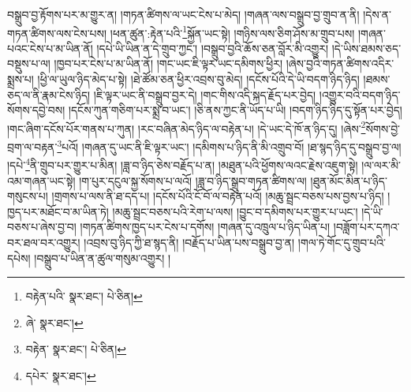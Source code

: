 བསྒྲུབ་བྱ་རྟོགས་པར་མ་གྱུར་ན། །གཏན་ཚིགས་ལ་ཡང་ངེས་པ་མེད། །གཞན་ལས་བསྒྲུབ་བྱ་གྲུབ་ན་ནི། །དེས་ན་གཏན་ཚིགས་ལས་ངེས་པས། །ཕན་ཚུན་:རྟེན་པའི་\footnote{བརྟེན་པའི་  སྣར་ཐང་།  པེ་ཅིན། }སྐྱོན་ཡང་སྟེ། །གཉིས་ལས་ཅིག་ཤོས་མ་གྲུབ་པས། །གཞན་པའང་ངེས་པ་མ་ཡིན་ནོ། །དཔེ་ཡི་ཡིན་ན་དེ་གྲུབ་ཀྱང་། །བསྒྲུབ་བྱའི་ཆོས་ཅན་བློར་མི་འགྱུར། །དེ་ཡིས་ཐམས་ཅད་བསྡུས་པ་ལ། །ཁྱབ་པར་ངེས་པ་མ་ཡིན་ནོ། །གང་ཡང་ཇི་ལྟར་ཡང་དམིགས་ཕྱིར། །ཞེས་བྱའི་གཏན་ཚིགས་འདིར་སྨྲས་པ། །ཕྱི་ལ་ཡུལ་ཉིད་མེད་པ་སྟེ། །ཐེ་ཚོམ་ཅན་ཕྱིར་འབྲས་བུ་མེད། །དངོས་པོའི་དེ་ཡི་བདག་ཉིད་ཉིད། །ཐམས་ཅད་ལ་ནི་རྣམ་ངེས་ཉིད། །ཇི་ལྟར་ཡང་ནི་བསྒྲུབ་བྱར་དེ། །གང་གིས་འདི་སྐད་རྗོད་པར་བྱེད། །འགྱུར་བའི་བདག་ཉིད་སོགས་དབྱེ་བས། །དངོས་ཀུན་གཅིག་པར་སྨྲ་བ་ཡང་། །ཅི་ནས་ཀྱང་ནི་ཡོད་པ་ཡི། །བདག་ཉིད་ཉིད་དུ་སྟོན་པར་བྱེད། །གང་ཞིག་དངོས་པོར་གནས་པ་ཀུན། །རང་བཞིན་མེད་ཉིད་ལ་བརྟེན་པ། །དེ་ཡང་དེ་ཁོ་ན་ཉིད་དུ། །ཞེས་\footnote{ཞེ་  སྣར་ཐང་། }སོགས་བྱེ་བྲག་ལ་བརྟན་\footnote{བརྟེན་  སྣར་ཐང་།  པེ་ཅིན། }པའོ། །གཞན་དུ་ཡང་ནི་ཇི་ལྟར་ཡང་། །དམིགས་པ་ཉིད་ནི་མི་འགྲུབ་བོ། །ཐ་སྙད་ཉིད་དུ་བསྒྲུབ་བྱ་ལ། །དཔེ་\footnote{དཔེར་  སྣར་ཐང་། }ནི་གྲུབ་པར་གྱུར་པ་མིན། །ཟླ་བ་ཉིད་ཅེས་བརྗོད་པ་ན། །མཐུན་པའི་ཕྱོགས་ལའང་རྗེས་འཇུག་སྟེ། །ལ་ལར་མི་འམ་གཞན་ཡང་སྟེ། །ག་པུར་དངུལ་སྐྱ་སོགས་པ་ལའོ། །ཟླ་བ་ཉིད་སྒྲུབ་གཏན་ཚིགས་ལ། །ཐུན་མོང་མིན་པ་ཉིད་གསུངས་པ། །གྲགས་པ་ལས་ནི་ཐ་དད་པ། །དངོས་པོའི་ངོ་བོ་ལ་བརྟེན་པའོ། །མཆུ་སྦྲང་བཅས་པས་བྱས་པ་ཉིད། །ཁྱད་པར་མཐོང་བ་མ་ཡིན་ཏེ། །མཆུ་སྦྲང་བཅས་པའི་རེག་པ་ལས། །བྱུང་བ་དམིགས་པར་གྱུར་པ་ཡང་། །དེ་ཡི་བཅས་པ་ཞེས་བྱ་བ། །གཏན་ཚིགས་ཁྱད་པར་ངེས་པ་དགོས། །གཞན་དུ་འཁྲུལ་པ་ཉིད་ཡིན་པ། །བཟློག་པར་དཀའ་བར་ཐལ་བར་འགྱུར། །འབྲས་བུ་ཉིད་ཀྱི་ཐ་སྙད་ནི། །བརྗོད་པ་ཡིན་པས་བསྒྲུབ་བྱ་ན། །གལ་ཏེ་གོང་དུ་གྲུབ་པའི་དཔེས། །བསྒྲུབ་པ་ཡིན་ན་ཚུལ་གསུམ་འགྱུར། །
